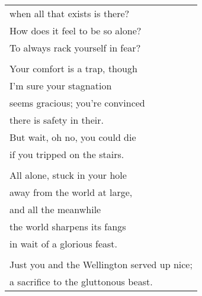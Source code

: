 \documentclass[empty]{article}
\begin{document}
\begin{center}
\begin{tabular}{l}
when all that exists is there? \\
How does it feel to be so alone? \\
To always rack yourself in fear? \\
\\
Your comfort is a trap, though \\
I'm sure your stagnation \\
seems gracious; you're convinced \\
there is safety in their. \\
But wait, oh no, you could die \\
if you tripped on the stairs. \\
\\
All alone, stuck in your hole \\
away from the world at large, \\
and all the meanwhile \\
the world sharpens its fangs \\
in wait of a glorious feast. \\
\\
Just you and the Wellington served up nice; \\
a sacrifice to the gluttonous beast. \\
\end{tabular}
\end{center}
\end{document}
